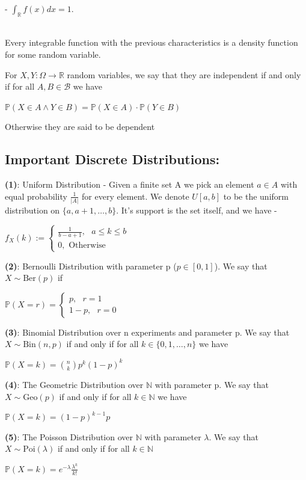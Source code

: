 \documentclass[../main.tex]{subfiles}
\begin{document}
- $\int_{\mathbb{R}} f(x) dx = 1$. \\\\
\begin{theorem} Every integrable function with the previous characteristics is a density function for some random variable. \end{theorem}
\begin{definition} For $X,Y:\Omega\rightarrow \mathbb{R}$ random variables, we say that they are independent if and only if for all $A,B\in\mathcal{B}$ we have
\begin{center}
    $\mathbb{P}(X\in A\land Y\in B) = \mathbb{P}(X\in A)\cdot \mathbb{P}(Y\in B)$
\end{center}
Otherwise they are said to be dependent
\end{definition}
\newpage
\subsection{Important Discrete Distributions:}
\textbf{(1)}: Uniform Distribution - Given a finite set A we pick an element $a\in A$ with equal probability $\frac{1}{|A|}$ for every element. We denote $U[a,b]$ to be the uniform distribution on $\{a,a+1,\dots,b\}$. It's support is the set itself, and we have - 
\begin{center}
    $f_X(k):=\begin{cases} \frac{1}{b-a+1}, \text{ } a\leq k\leq b \\  0, \text{ Otherwise}\end{cases}$
\end{center}
\textbf{(2)}: Bernoulli Distribution with parameter p ($p\in[0,1]$). We say that $X\sim\text{Ber}(p)$ if 
\begin{center}
    $\mathbb{P}(X=r) = \begin{cases} p, \text{ } r=1 \\ 1-p, \text{ } r=0 \end{cases}$
\end{center} 
\textbf{(3)}: Binomial Distribution over n experiments and parameter p. We say that $X\sim\text{Bin}(n,p)$ if and only if for all $k\in\{0,1,\dots,n\}$ we have
\begin{center}
    $\mathbb{P}(X=k) = \binom{n}{k} p^k (1-p)^k$
\end{center}
\textbf{(4)}: The Geometric Distribution over $\mathbb{N}$ with parameter p. We say that $X\sim\text{Geo}(p)$ if and only if for all $k\in\mathbb{N}$ we have
\begin{center}
    $\mathbb{P}(X=k) = (1-p)^{k-1} p $
\end{center}
\textbf{(5)}: The Poisson Distribution over $\mathbb{N}$ with parameter $\lambda$. We say that $X\sim\text{Poi}(\lambda)$ if and only if for all $k\in\mathbb{N}$
\begin{center}
    $\mathbb{P}(X=k) = e^{-\lambda}\frac{\lambda^k}{k!}$
\end{center}
\newpage
\end{document}
